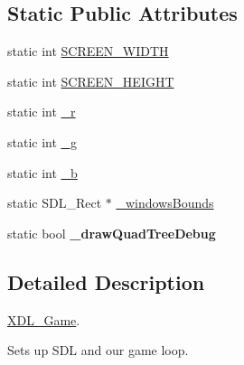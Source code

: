 \subsection*{Static Public Attributes}
\begin{DoxyCompactItemize}
\item 
static int \hyperlink{class_x_d_l___game_a2168cd95816117ff5f905692439aeb72}{S\-C\-R\-E\-E\-N\-\_\-\-W\-I\-D\-T\-H}
\item 
static int \hyperlink{class_x_d_l___game_a9fde7fa33a7816a1e3f17313ebca9001}{S\-C\-R\-E\-E\-N\-\_\-\-H\-E\-I\-G\-H\-T}
\item 
static int \hyperlink{class_x_d_l___game_a0c6b24dee1668f4a1079d389efda2ccf}{\-\_\-r}
\item 
static int \hyperlink{class_x_d_l___game_a0d18c646bd050e6e5bf93efd1b00a8a8}{\-\_\-g}
\item 
static int \hyperlink{class_x_d_l___game_a2d89ed8221d33e4a4351c93d4190464c}{\-\_\-b}
\item 
static S\-D\-L\-\_\-\-Rect $\ast$ \hyperlink{class_x_d_l___game_aba18e8d33ee6e87494ebb958f2beee67}{\-\_\-windows\-Bounds}
\item 
\hypertarget{class_x_d_l___game_a9c39cc328bfb63e51e752c1b1a28d6d7}{static bool {\bfseries \-\_\-draw\-Quad\-Tree\-Debug}}\label{class_x_d_l___game_a9c39cc328bfb63e51e752c1b1a28d6d7}

\end{DoxyCompactItemize}


\subsection{Detailed Description}
\hyperlink{class_x_d_l___game}{X\-D\-L\-\_\-\-Game}. 

Sets up S\-D\-L and our game loop. 

